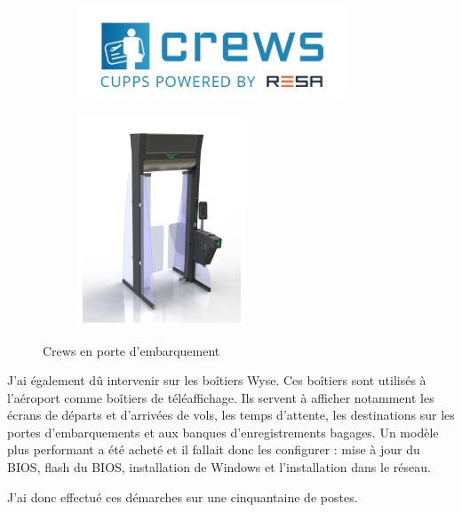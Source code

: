 \begin{figure}[hbt!]
  \begin{subfigure}{0.5\textwidth}
    \centering
    \includegraphics[width=8cm]{Images/logocrews.png}  
    \label{fig:logocrews}
  \end{subfigure}
  \begin{subfigure}{0.5\textwidth}
    \centering
    \includegraphics[width=5cm]{Images/crews2.png}\newline  
    \label{fig:portecrews}
  \end{subfigure}
  \caption{Crews en porte d'embarquement}
\end{figure}


J’ai également dû intervenir sur les boîtiers Wyse. Ces boîtiers sont utilisés à l’aéroport comme boîtiers de téléaffichage. Ils servent à afficher notamment les écrans de départs et d’arrivées de vols, les temps d’attente, les destinations sur les portes d’embarquements et aux banques d'enregistrements bagages. Un modèle plus performant a été acheté et il fallait donc les configurer : mise à jour du BIOS, flash du BIOS, installation de Windows et l’installation dans le réseau.


J’ai donc effectué ces démarches sur une cinquantaine de postes.\newline

